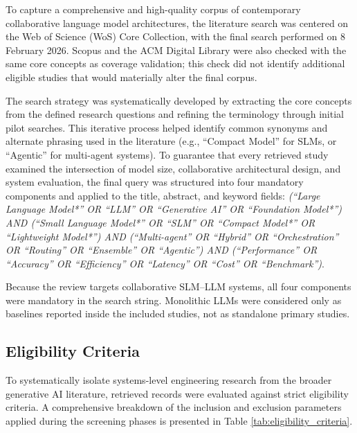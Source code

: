 To capture a comprehensive and high-quality corpus of contemporary collaborative language model architectures, the literature search was centered on the Web of Science (WoS) Core Collection, with the final search performed on 8 February 2026. Scopus and the ACM Digital Library were also checked with the same core concepts as coverage validation; this check did not identify additional eligible studies that would materially alter the final corpus.

The search strategy was systematically developed by extracting the core concepts from the defined research questions and refining the terminology through initial pilot searches. This iterative process helped identify common synonyms and alternate phrasing used in the literature (e.g., ``Compact Model'' for SLMs, or ``Agentic'' for multi-agent systems). To guarantee that every retrieved study examined the intersection of model size, collaborative architectural design, and system evaluation, the final query was structured into four mandatory components and applied to the title, abstract, and keyword fields: \textit{(``Large Language Model*'' OR ``LLM'' OR ``Generative AI'' OR ``Foundation Model*'') AND (``Small Language Model*'' OR ``SLM'' OR ``Compact Model*'' OR ``Lightweight Model*'') AND (``Multi-agent'' OR ``Hybrid'' OR ``Orchestration'' OR ``Routing'' OR ``Ensemble'' OR ``Agentic'') AND (``Performance'' OR ``Accuracy'' OR ``Efficiency'' OR ``Latency'' OR ``Cost'' OR ``Benchmark'')}.

Because the review targets collaborative SLM--LLM systems, all four components were mandatory in the search string. Monolithic LLMs were considered only as baselines reported inside the included studies, not as standalone primary studies.

\subsection{Eligibility Criteria}
\label{sec:eligibility_criteria}

To systematically isolate systems-level engineering research from the broader generative AI literature, retrieved records were evaluated against strict eligibility criteria. A comprehensive breakdown of the inclusion and exclusion parameters applied during the screening phases is presented in Table \ref{tab:eligibility_criteria}.

